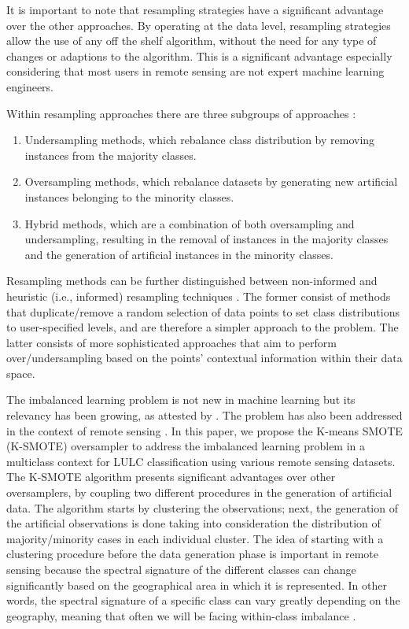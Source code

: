 \documentclass[parskip=full]{scrartcl}
\begin{document}
It is important to note that resampling strategies have a significant advantage
over the other approaches. By operating at the data level, resampling strategies
allow the use of any off the shelf algorithm, without the need for any type of
changes or adaptions to the algorithm. This is a significant advantage
especially considering that most users in remote sensing are not expert machine
learning engineers. 

Within resampling approaches there are three subgroups of approaches
\cite{Fernandez2013,Kaur2019,Luengo2020}:

\begin{enumerate}
    \item Undersampling methods, which rebalance class distribution by removing
        instances from the majority classes.
    \item Oversampling methods, which rebalance datasets by generating new
        artificial instances belonging to the minority classes.
    \item Hybrid methods, which are a combination of both oversampling and
        undersampling, resulting in the removal of instances in the majority
        classes and the generation of artificial instances in the minority
        classes.
\end{enumerate}

Resampling methods can be further distinguished between non-informed and
heuristic (i.e., informed) resampling techniques
\cite{Fernandez2013,Luengo2020,Garcia2016}. The former consist of methods that
duplicate/remove a random selection of data points to set class distributions to
user-specified levels, and are therefore a simpler approach to the problem. The
latter consists of more sophisticated approaches that aim to perform
over/undersampling based on the points' contextual information within their data
space.

The imbalanced learning problem is not new in machine learning but its
relevancy has been growing, as attested by \cite{Haixiang2017}. The problem
has also been addressed in the context of remote sensing \cite{Douzas2019rs}.
In this paper, we propose the K-means SMOTE (K-SMOTE) \cite{Douzas2018}
oversampler to address the imbalanced learning problem in a multiclass context
for LULC classification using various remote sensing datasets. The K-SMOTE
algorithm presents significant advantages over other oversamplers, by coupling
two different procedures in the generation of artificial data. The algorithm
starts by clustering the observations; next, the generation of the artificial
observations is done taking into consideration the distribution of
majority/minority cases in each individual cluster. The idea of starting with
a clustering procedure before the data generation phase is important in
remote sensing because the spectral signature of the different classes can
change significantly based on the geographical area in which it is represented.
In other words, the spectral signature of a specific class can vary greatly
depending on the geography, meaning that often we will be facing within-class
imbalance \cite{Japkowicz2001}.
\end{document}
